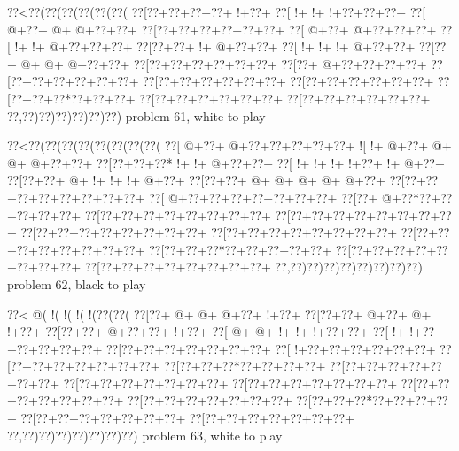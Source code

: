 \vbox{\vbox{\goo
\0??<\0??(\0??(\0??(\0??(\0??(\0??(
\0??[\0??+\0??+\0??+\0??+\- !+\0??+
\0??[\- !+\- !+\- !+\0??+\0??+\0??+
\0??[\- @+\0??+\- @+\- @+\0??+\0??+
\0??[\0??+\0??+\0??+\0??+\0??+\0??+
\0??[\- @+\0??+\- @+\0??+\0??+\0??+
\0??[\- !+\- !+\- @+\0??+\0??+\0??+
\0??[\0??+\0??+\- !+\- @+\0??+\0??+
\0??[\- !+\- !+\- !+\- @+\0??+\0??+
\0??[\0??+\- @+\- @+\- @+\0??+\0??+
\0??[\0??+\0??+\0??+\0??+\0??+\0??+
\0??[\0??+\- @+\0??+\0??+\0??+\0??+
\0??[\0??+\0??+\0??+\0??+\0??+\0??+
\0??[\0??+\0??+\0??+\0??+\0??+\0??+
\0??[\0??+\0??+\0??+\0??+\0??+\0??+
\0??[\0??+\0??+\0??*\0??+\0??+\0??+
\0??[\0??+\0??+\0??+\0??+\0??+\0??+
\0??[\0??+\0??+\0??+\0??+\0??+\0??+
\0??,\0??)\0??)\0??)\0??)\0??)\0??)
}
\hfil problem 61, white to play\hfil\break
}

\vbox{\vbox{\goo
\0??<\0??(\0??(\0??(\0??(\0??(\0??(\0??(\0??(
\0??[\- @+\0??+\- @+\0??+\0??+\0??+\0??+\0??+
\- ![\- !+\- @+\0??+\- @+\- @+\- @+\0??+\0??+
\0??[\0??+\0??+\0??*\- !+\- !+\- @+\0??+\0??+
\0??[\- !+\- !+\- !+\- !+\0??+\- !+\- @+\0??+
\0??[\0??+\0??+\- @+\- !+\- !+\- !+\- @+\0??+
\0??[\0??+\0??+\- @+\- @+\- @+\- @+\- @+\0??+
\0??[\0??+\0??+\0??+\0??+\0??+\0??+\0??+\0??+
\0??[\- @+\0??+\0??+\0??+\0??+\0??+\0??+\0??+
\0??[\0??+\- @+\0??*\0??+\0??+\0??+\0??+\0??+
\0??[\0??+\0??+\0??+\0??+\0??+\0??+\0??+\0??+
\0??[\0??+\0??+\0??+\0??+\0??+\0??+\0??+\0??+
\0??[\0??+\0??+\0??+\0??+\0??+\0??+\0??+\0??+
\0??[\0??+\0??+\0??+\0??+\0??+\0??+\0??+\0??+
\0??[\0??+\0??+\0??+\0??+\0??+\0??+\0??+\0??+
\0??[\0??+\0??+\0??*\0??+\0??+\0??+\0??+\0??+
\0??[\0??+\0??+\0??+\0??+\0??+\0??+\0??+\0??+
\0??[\0??+\0??+\0??+\0??+\0??+\0??+\0??+\0??+
\0??,\0??)\0??)\0??)\0??)\0??)\0??)\0??)\0??)
}
\hfil problem 62, black to play\hfil\break
}

\vbox{\vbox{\goo
\0??<\- @(\- !(\- !(\- !(\- !(\0??(\0??(
\0??[\0??+\- @+\- @+\- @+\0??+\- !+\0??+
\0??[\0??+\0??+\- @+\0??+\- @+\- !+\0??+
\0??[\0??+\0??+\- @+\0??+\0??+\- !+\0??+
\0??[\- @+\- @+\- !+\- !+\- !+\0??+\0??+
\0??[\- !+\- !+\0??+\0??+\0??+\0??+\0??+
\0??[\0??+\0??+\0??+\0??+\0??+\0??+\0??+
\0??[\- !+\0??+\0??+\0??+\0??+\0??+\0??+
\0??[\0??+\0??+\0??+\0??+\0??+\0??+\0??+
\0??[\0??+\0??+\0??*\0??+\0??+\0??+\0??+
\0??[\0??+\0??+\0??+\0??+\0??+\0??+\0??+
\0??[\0??+\0??+\0??+\0??+\0??+\0??+\0??+
\0??[\0??+\0??+\0??+\0??+\0??+\0??+\0??+
\0??[\0??+\0??+\0??+\0??+\0??+\0??+\0??+
\0??[\0??+\0??+\0??+\0??+\0??+\0??+\0??+
\0??[\0??+\0??+\0??*\0??+\0??+\0??+\0??+
\0??[\0??+\0??+\0??+\0??+\0??+\0??+\0??+
\0??[\0??+\0??+\0??+\0??+\0??+\0??+\0??+
\0??,\0??)\0??)\0??)\0??)\0??)\0??)\0??)
}
\hfil problem 63, white to play\hfil\break
}

